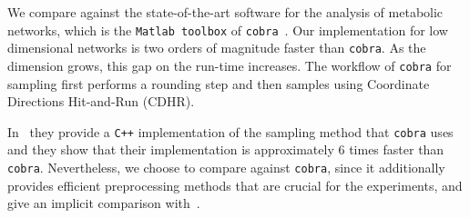    We compare against the state-of-the-art software for the analysis of
   metabolic networks, which is the \texttt{Matlab toolbox} of \texttt{cobra}~\cite{heirendt2019creation}. Our implementation for low dimensional
   networks is two orders of magnitude faster than \texttt{cobra}.
   As the dimension grows, this gap on the run-time increases.
   The workflow of \texttt{cobra} for sampling first performs a rounding step and then samples using Coordinate Directions Hit-and-Run (CDHR).

   In~\cite{jadebeck2020hops} they provide a \texttt{C++} implementation of the
   sampling method that \texttt{cobra} uses and they show that their implementation is
   approximately $6$ times faster than \texttt{cobra}. Nevertheless, we choose to
   compare against \texttt{cobra}, since it additionally provides efficient
   preprocessing methods that are crucial for the experiments, and give an implicit
   comparison with~\cite{jadebeck2020hops}.

